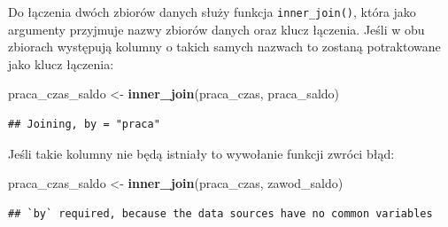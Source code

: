 \documentclass[]{book}
\newenvironment{Shaded}{\begin{snugshade}}{\end{snugshade}}
\newcommand{\KeywordTok}[1]{\textcolor[rgb]{0.13,0.29,0.53}{\textbf{#1}}}
\newcommand{\DataTypeTok}[1]{\textcolor[rgb]{0.13,0.29,0.53}{#1}}
\newcommand{\StringTok}[1]{\textcolor[rgb]{0.31,0.60,0.02}{#1}}
\newcommand{\OperatorTok}[1]{\textcolor[rgb]{0.81,0.36,0.00}{\textbf{#1}}}
\newcommand{\NormalTok}[1]{#1}
\begin{document}
\begin{Shaded}
\end{Shaded}

Do łączenia dwóch zbiorów danych służy funkcja \texttt{inner\_join()},
która jako argumenty przyjmuje nazwy zbiorów danych oraz klucz łączenia.
Jeśli w obu zbiorach występują kolumny o takich samych nazwach to
zostaną potraktowane jako klucz łączenia:

\begin{Shaded}
\begin{Highlighting}[]
\NormalTok{praca_czas_saldo <-}\StringTok{ }\KeywordTok{inner_join}\NormalTok{(praca_czas, praca_saldo)}
\end{Highlighting}
\end{Shaded}

\begin{verbatim}
## Joining, by = "praca"
\end{verbatim}

Jeśli takie kolumny nie będą istniały to wywołanie funkcji zwróci błąd:

\begin{Shaded}
\begin{Highlighting}[]
\NormalTok{praca_czas_saldo <-}\StringTok{ }\KeywordTok{inner_join}\NormalTok{(praca_czas, zawod_saldo)}
\end{Highlighting}
\end{Shaded}

\begin{verbatim}
## `by` required, because the data sources have no common variables
\end{verbatim}
\end{document}
